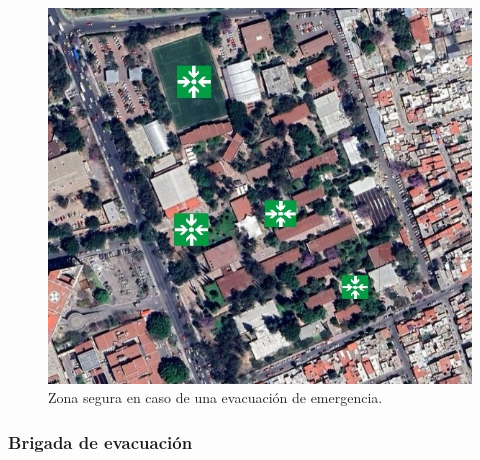     \begin{figure}[H]
        \centering
        \includegraphics[scale=0.4]{35/Img/puntosReunion.jpg}
        \caption{Zona segura en caso de una evacuación de emergencia.}
    \end{figure}
    
    \subsubsection{Brigada de evacuación}
    
